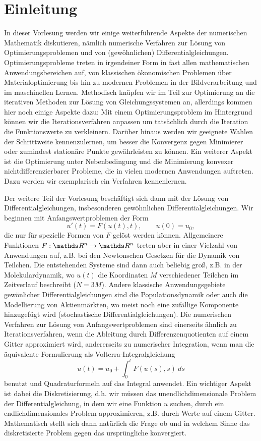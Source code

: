 \chapter{Einleitung}

In dieser Vorlesung werden wir einige weiterführende Aspekte der numerischen Mathematik diskutieren, nämlich numerische Verfahren zur Lösung von Optimierungsproblemen und von (gewöhnlichen) Differentialgleichungen.
Optimierungsprobleme treten in irgendeiner Form in fast allen mathematischen Anwendungsbereichen auf, von klassischen ökonomischen Problemen über Materialoptimierung bis hin zu modernen Problemen in der Bildverarbeitung und im maschinellen Lernen. 
Methodisch knüpfen wir im Teil zur Optimierung an die iterativen Methoden zur Lösung von Gleichungssystemen an, allerdings kommen hier noch einige Aspekte dazu: Mit einem Optimierungsproblem im Hintergrund können wir die Iterationsverfahren anpassen um tatsächlich durch die Iteration die Funktionswerte zu verkleinern. 
Darüber hinaus werden wir geeignete Wahlen der Schrittweite kennenzulernen, um besser die Konvergenz gegen Minimierer oder zumindest stationäre Punkte gewährleisten zu können. 
Ein weiterer Aspekt ist die Optimierung unter Nebenbedingung und die Minimierung konvexer nichtdifferenzierbarer Probleme, die in vielen modernen Anwendungen auftreten. Dazu werden wir exemplarisch ein Verfahren kennenlernen.

Der weitere Teil der Vorlesung beschäftigt sich dann mit der Lösung von Differentialgleichungen, insbesonderen gewöhnlichen Differentialgleichungen.
Wir beginnen mit Anfangswertproblemen der Form
$$ u'(t) = F(u(t),t), \qquad u(0)=u_0, $$
die nur für spezielle Formen von $F$ gelöst werden können. 
Allgemeinere Funktionen $F:\R^n \rightarrow \R^n$ treten aber in einer Vielzahl von Anwendungen auf, z.B. bei den Newtonschen Gesetzen für die Dynamik von Teilchen. Die entstehenden Systeme sind dann auch beliebig gro{\ss}, z.B. in der Molekulardynamik, wo $u(t)$ die Koordinaten $M$ verschiedener Teilchen im Zeitverlauf beschreibt ($N=3M$). 
Andere klassische Anwendungsgebiete gewönlicher Differentialgleichungen sind die Populationsdynamik oder auch die Modellierung von Aktienmärkten, wo meist noch eine zufällige Komponente hinzugefügt wird (stochastische Differentialgleichungen). 
Die numerischen Verfahren zur Lösung von Anfangswertproblemen sind einerseits ähnlich zu Iterationsverfahren, wenn die Ableitung durch Differenzenquotienten auf einem Gitter approximiert wird, andererseits zu numerischer Integration, wenn man die äquivalente Formulierung als Volterra-Integralgleichung
$$ u(t) = u_0 + \int_0^t F(u(s),s)~ds$$
benutzt und Quadraturformeln auf das Integral anwendet. 
Ein wichtiger Aspekt ist dabei die Diskretisierung, d.h. wir müssen das unendlichdimensionale Problem der Differentialgleichung, in dem wir eine Funktion $u$ suchen, durch ein endlichdimensionales Problem approximieren, z.B. durch Werte auf einem Gitter. 
Mathematisch stellt sich dann natürlich die Frage ob und in welchem Sinne das diskretisierte Problem gegen das ursprüngliche konvergiert. 

